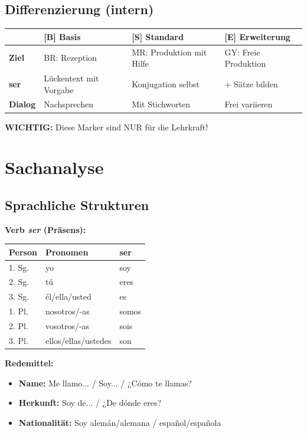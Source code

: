 \documentclass[11pt,a4paper]{article}
\newcommand{\B}{\textcolor{basis}{\textbf{[B]}}}
\newcommand{\Std}{\textcolor{standard}{\textbf{[S]}}}
\newcommand{\E}{\textcolor{erweiterung}{\textbf{[E]}}}
\begin{document}
\subsection{Differenzierung (intern)}
\begin{tabular}{|l|p{3.5cm}|p{3.5cm}|p{3.5cm}|}
\hline
& \B{} \textbf{Basis} & \Std{} \textbf{Standard} & \E{} \textbf{Erweiterung} \\
\hline
\textbf{Ziel} & BR: Rezeption & MR: Produktion mit Hilfe & GY: Freie Produktion \\
\hline
\textbf{ser} & Lückentext mit Vorgabe & Konjugation selbst & + Sätze bilden \\
\hline
\textbf{Dialog} & Nachsprechen & Mit Stichworten & Frei variieren \\
\hline
\end{tabular}

\vspace{0.5em}
\textbf{WICHTIG:} Diese Marker sind NUR für die Lehrkraft!

\section{Sachanalyse}

\subsection{Sprachliche Strukturen}

\textbf{Verb \textit{ser} (Präsens):}
\begin{center}
\begin{tabular}{|l|l|l|}
\hline
\textbf{Person} & \textbf{Pronomen} & \textbf{ser} \\
\hline
1. Sg. & yo & soy \\
2. Sg. & tú & eres \\
3. Sg. & él/ella/usted & es \\
1. Pl. & nosotros/-as & somos \\
2. Pl. & vosotros/-as & sois \\
3. Pl. & ellos/ellas/ustedes & son \\
\hline
\end{tabular}
\end{center}

\textbf{Redemittel:}
\begin{itemize}
    \item \textbf{Name:} Me llamo... / Soy... / ¿Cómo te llamas?
    \item \textbf{Herkunft:} Soy de... / ¿De dónde eres?
    \item \textbf{Nationalität:} Soy alemán/alemana / español/española
\end{itemize}
\end{document}
